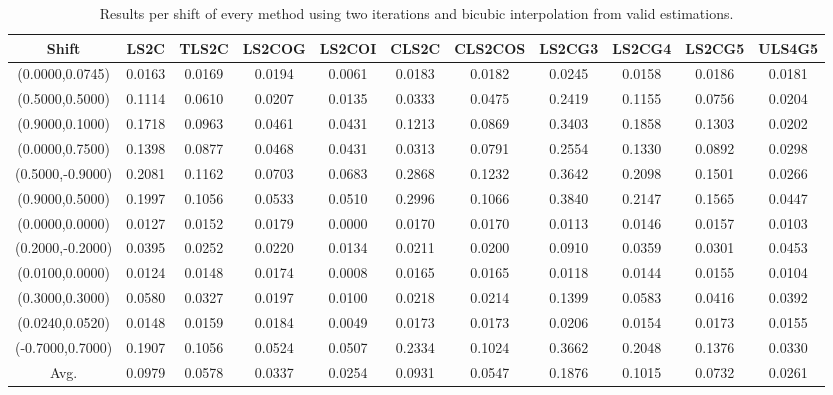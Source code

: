 \begin{table}[ht!]
\centering
\begin{tabular}{c|c|c|c|c|c|c|c|c|c|c}
Shift & \scriptsize{LS2C} & \scriptsize{TLS2C} & \scriptsize{LS2COG} & \scriptsize{LS2COI} & \scriptsize{CLS2C} & \scriptsize{CLS2COS} & \scriptsize{LS2CG3} & \scriptsize{LS2CG4} & \scriptsize{LS2CG5} & \scriptsize{ULS4G5}\\ \hline 
(0.0000,0.0745) & 0.0163 & 0.0169 & 0.0194 & 0.0061 & 0.0183 & 0.0182 & 0.0245 & 0.0158 & 0.0186 & 0.0181 \\ \hline
(0.5000,0.5000) & 0.1114 & 0.0610 & 0.0207 & 0.0135 & 0.0333 & 0.0475 & 0.2419 & 0.1155 & 0.0756 & 0.0204 \\ \hline
(0.9000,0.1000) & 0.1718 & 0.0963 & 0.0461 & 0.0431 & 0.1213 & 0.0869 & 0.3403 & 0.1858 & 0.1303 & 0.0202 \\ \hline
(0.0000,0.7500) & 0.1398 & 0.0877 & 0.0468 & 0.0431 & 0.0313 & 0.0791 & 0.2554 & 0.1330 & 0.0892 & 0.0298 \\ \hline
(0.5000,-0.9000) & 0.2081 & 0.1162 & 0.0703 & 0.0683 & 0.2868 & 0.1232 & 0.3642 & 0.2098 & 0.1501 & 0.0266 \\ \hline
(0.9000,0.5000) & 0.1997 & 0.1056 & 0.0533 & 0.0510 & 0.2996 & 0.1066 & 0.3840 & 0.2147 & 0.1565 & 0.0447 \\ \hline
(0.0000,0.0000) & 0.0127 & 0.0152 & 0.0179 & 0.0000 & 0.0170 & 0.0170 & 0.0113 & 0.0146 & 0.0157 & 0.0103 \\ \hline
(0.2000,-0.2000) & 0.0395 & 0.0252 & 0.0220 & 0.0134 & 0.0211 & 0.0200 & 0.0910 & 0.0359 & 0.0301 & 0.0453 \\ \hline
(0.0100,0.0000) & 0.0124 & 0.0148 & 0.0174 & 0.0008 & 0.0165 & 0.0165 & 0.0118 & 0.0144 & 0.0155 & 0.0104 \\ \hline
(0.3000,0.3000) & 0.0580 & 0.0327 & 0.0197 & 0.0100 & 0.0218 & 0.0214 & 0.1399 & 0.0583 & 0.0416 & 0.0392 \\ \hline
(0.0240,0.0520) & 0.0148 & 0.0159 & 0.0184 & 0.0049 & 0.0173 & 0.0173 & 0.0206 & 0.0154 & 0.0173 & 0.0155 \\ \hline
(-0.7000,0.7000) & 0.1907 & 0.1056 & 0.0524 & 0.0507 & 0.2334 & 0.1024 & 0.3662 & 0.2048 & 0.1376 & 0.0330 \\ \hline
Avg.  & 0.0979 & 0.0578 & 0.0337 & 0.0254 & 0.0931 & 0.0547 & 0.1876 & 0.1015 & 0.0732 & 0.0261 \\ \hline
\end{tabular}
\caption{Results per shift of every method using two iterations and bicubic interpolation from valid estimations.}
\label{tab:2itCperShiftValid}
\end{table}


